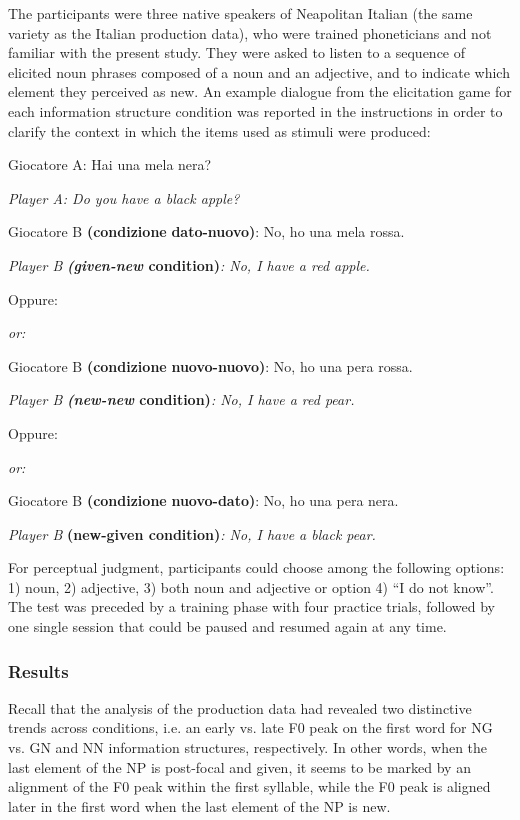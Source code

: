 The participants were three native speakers of Neapolitan Italian (the same variety as the Italian production data), who were trained phoneticians and not familiar with the present study. They were asked to listen to a sequence of elicited noun phrases composed of a noun and an adjective, and to indicate which element they perceived as new. An example dialogue from the elicitation game for each information structure condition was reported in the instructions in order to clarify the context in which the items used as stimuli were produced:

Giocatore A: Hai una mela nera?

\textit{Player A: Do you have a black apple?}

Giocatore B \textbf{(condizione} \textbf{dato-nuovo)}: No, ho una mela rossa.

\textit{Player B} \textbf{\textit{(given-new} \textbf{condition)}}\textit{: No, I have a red apple.}

Oppure:

\textit{or:}

Giocatore B \textbf{(condizione} \textbf{nuovo-nuovo)}: No, ho una pera rossa.

\textit{Player B} \textbf{\textit{(new-new} \textbf{condition)}}\textit{: No, I have a red pear.}

Oppure:

\textit{or:}

Giocatore B \textbf{(condizione} \textbf{nuovo-dato)}: No, ho una pera nera.

\textit{Player B}\textbf{ \textbf{(new-given} \textbf{condition)}}\textit{: No, I have a black pear.}

For perceptual judgment, participants could choose among the following options: 1) noun, 2) adjective, 3) both noun and adjective or option 4) “I do not know”. The test was preceded by a training phase with four practice trials, followed by one single session that could be paused and resumed again at any time.

\subsubsection{Results}
\hypertarget{Toc191305902}{}
Recall that the analysis of the production data had revealed two distinctive trends across conditions, i.e. an early vs. late F0 peak on the first word for NG vs. GN and NN information structures, respectively. In other words, when the last element of the NP is post-focal and given, it seems to be marked by an alignment of the F0 peak within the first syllable, while the F0 peak is aligned later in the first word when the last element of the NP is new.

